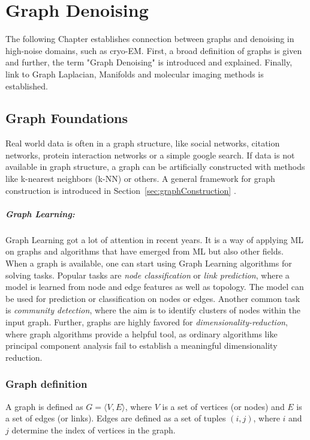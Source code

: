 \chapter{Graph Denoising}
\label{sec:graphFoundations}
    

The following Chapter establishes connection between graphs and denoising in high-noise 
domains, such as cryo-EM.
First, a broad definition of graphs is given and further, the term "Graph Denoising" is
introduced and explained. Finally, link to Graph Laplacian, Manifolds and molecular imaging methods is established.

\section{Graph Foundations}
Real world data is often in a graph structure, like social networks, citation networks,
protein interaction networks or a simple google search. 
If data is not available in graph structure, a graph can be artificially constructed with methods like k-nearest neighbors (k-NN) or others.
A general framework for graph construction is introduced in Section~\ref{sec:graphConstruction} \textit{}.

\paragraph{Graph Learning:} Graph Learning got a lot of attention in recent years.
It is a way of applying ML on graphs and algorithms that have emerged from ML but also other fields.
When a graph is available, one can start using Graph Learning algorithms for solving tasks.
Popular tasks are \textit{node classification} or \textit{link prediction}, where a model is learned from node and edge features 
as well as topology. The model can be used for prediction or classification on nodes or edges.
Another common task is \textit{community detection}, where the aim is to identify clusters of nodes within the input graph.
Further, graphs are highly favored for \textit{dimensionality-reduction}, where 
graph algorithms provide a helpful tool, as ordinary algorithms like principal component analysis fail to 
establish a meaningful dimensionality reduction.

\subsection{Graph definition}
A graph is defined as $G = \langle V,E \rangle$, where $V$ is a set of 
vertices (or nodes) and $E$ is a set of edges (or links). 
Edges are defined as a set of tuples $(i, j)$, where $i$ and $j$ determine 
the index of vertices in the graph.

